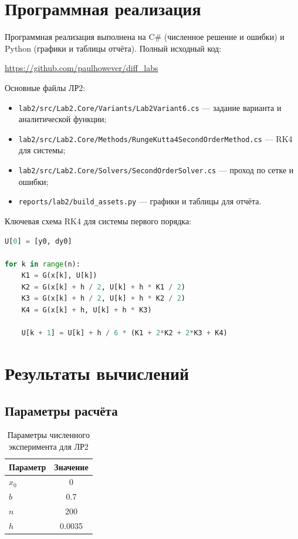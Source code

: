 \documentclass[12pt,a4paper]{article}
\begin{document}
\section{Программная реализация}
Программная реализация выполнена на C\# (численное решение и ошибки) и Python (графики и таблицы отчёта). Полный исходный код:

\begin{center}
\url{https://github.com/paulhowever/diff_labs}
\end{center}

Основные файлы ЛР2:
\begin{itemize}
\item \texttt{lab2/src/Lab2.Core/Variants/Lab2Variant6.cs} --- задание варианта и аналитической функции;
\item \texttt{lab2/src/Lab2.Core/Methods/RungeKutta4SecondOrderMethod.cs} --- RK4 для системы;
\item \texttt{lab2/src/Lab2.Core/Solvers/SecondOrderSolver.cs} --- проход по сетке и ошибки;
\item \texttt{reports/lab2/build\_assets.py} --- графики и таблицы для отчёта.
\end{itemize}

Ключевая схема RK4 для системы первого порядка:
\begin{lstlisting}[language=Python, caption={Общая схема RK4 для системы первого порядка}]
U[0] = [y0, dy0]

for k in range(n):
    K1 = G(x[k], U[k])
    K2 = G(x[k] + h / 2, U[k] + h * K1 / 2)
    K3 = G(x[k] + h / 2, U[k] + h * K2 / 2)
    K4 = G(x[k] + h, U[k] + h * K3)

    U[k + 1] = U[k] + h / 6 * (K1 + 2*K2 + 2*K3 + K4)
\end{lstlisting}

\section{Результаты вычислений}
\subsection{Параметры расчёта}
\begin{table}[H]
\centering
\begin{tabular}{lc}
\toprule
Параметр & Значение \\
\midrule
$x_0$ & 0 \\
$b$ & 0.7 \\
$n$ & 200 \\
$h$ & 0.0035 \\
\bottomrule
\end{tabular}
\caption{Параметры численного эксперимента для ЛР2}
\label{tab:lab2_params}
\end{table}
\end{document}
